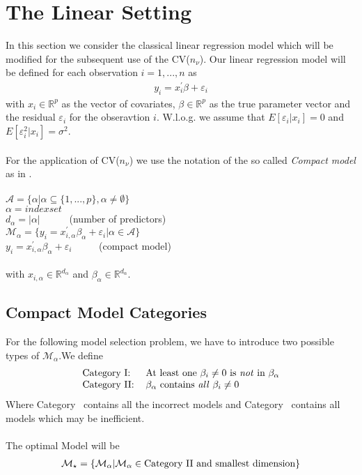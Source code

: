 \documentclass[Research_Module_ES.tex]{subfiles}
\begin{document}
\section{The Linear Setting}

In this section we consider the classical linear regression model which will be modified for the subsequent use of the CV($n_\nu$). Our linear regression model will be defined for each observation $i=1,...,n$ as
\begin{align*}
y_i=x_i^\prime\beta+\varepsilon_i
\end{align*}
with $x_i\in\mathbb{R}^p$ as the vector of covariates, $\beta\in\mathbb{R}^p$ as the true parameter vector and the residual $\varepsilon_i$ for the obseravtion $i$.
W.l.o.g. we assume that $E[\varepsilon_i|x_i]=0$ and $E[\varepsilon_i^2|x_i]=\sigma^2$.
\\\\
For the application of CV($n_\nu$) we use the notation of the so called \textit{Compact model} as in \cite{shao}. \\\\
$\mathcal{A}=\{\alpha|\alpha\subseteq\{1,...,p\},\alpha\neq\emptyset\}$\\
$\alpha=index set$\\
$d_\alpha=|\alpha|~~~~~~~~~~~~$ (number of predictors)\\
$\mathcal{M}_\alpha=\{y_i=x_{i,\alpha}^\prime\beta_\alpha+\varepsilon_i|\alpha\in\mathcal{A}\}$\\
$y_i=x_{i,\alpha}^\prime\beta_\alpha+\varepsilon_i~~~~~~~~~~~$ (compact model)\\\\
with $x_{i,\alpha}\in\mathbb{R}^{d_\alpha}$ and $\beta_\alpha\in\mathbb{R}^{d_\alpha}$.

\subsection{Compact Model Categories}
For the following model selection problem, we have to introduce two possible types of $\mathcal{M}_\alpha$.We define
\begin{align*}
\begin{tabular}{ll}
Category~\RM{1}:& At least one $\beta_i\neq 0$ is \textit{not} in $\beta_\alpha$\\
Category~\RM{2}:& $\beta_\alpha$ contains \textit{all} $\beta_i\neq 0$
\end{tabular}
\end{align*}
Where Category~ contains all the incorrect models and Category~ contains all models which may be inefficient.\\\\
The optimal Model will be 
\begin{align*}
\mathcal{M}_\star=\{\mathcal{M}_\alpha|\mathcal{M}_\alpha\in \text{Category~\RM{2}~and smallest dimension} \}
\end{align*}
\end{document}
